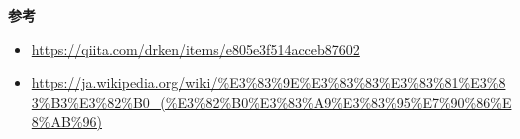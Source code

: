 \textbf{参考} \\
\begin{itemize}
  \item \url{https://qiita.com/drken/items/e805e3f514acceb87602}
  \item \url{https://ja.wikipedia.org/wiki/%E3%83%9E%E3%83%83%E3%83%81%E3%83%B3%E3%82%B0_(%E3%82%B0%E3%83%A9%E3%83%95%E7%90%86%E8%AB%96)}
\end{itemize}